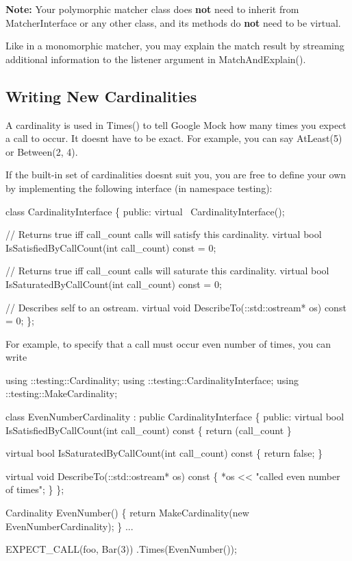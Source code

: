 {\bfseries Note\+:} Your polymorphic matcher class does {\bfseries not} need to inherit from {\ttfamily Matcher\+Interface} or any other class, and its methods do {\bfseries not} need to be virtual.

Like in a monomorphic matcher, you may explain the match result by streaming additional information to the {\ttfamily listener} argument in {\ttfamily Match\+And\+Explain()}.

\subsection*{Writing New Cardinalities}

A cardinality is used in {\ttfamily Times()} to tell Google Mock how many times you expect a call to occur. It doesn\textquotesingle{}t have to be exact. For example, you can say {\ttfamily At\+Least(5)} or {\ttfamily Between(2, 4)}.

If the built-\/in set of cardinalities doesn\textquotesingle{}t suit you, you are free to define your own by implementing the following interface (in namespace {\ttfamily testing})\+:


\begin{DoxyCode}
class CardinalityInterface \{
 public:
  virtual ~CardinalityInterface();

  // Returns true iff call\_count calls will satisfy this cardinality.
  virtual bool IsSatisfiedByCallCount(int call\_count) const = 0;

  // Returns true iff call\_count calls will saturate this cardinality.
  virtual bool IsSaturatedByCallCount(int call\_count) const = 0;

  // Describes self to an ostream.
  virtual void DescribeTo(::std::ostream* os) const = 0;
\};
\end{DoxyCode}


For example, to specify that a call must occur even number of times, you can write


\begin{DoxyCode}
using ::testing::Cardinality;
using ::testing::CardinalityInterface;
using ::testing::MakeCardinality;

class EvenNumberCardinality : public CardinalityInterface \{
 public:
  virtual bool IsSatisfiedByCallCount(int call\_count) const \{
    return (call\_count %
  \}

  virtual bool IsSaturatedByCallCount(int call\_count) const \{
    return false;
  \}

  virtual void DescribeTo(::std::ostream* os) const \{
    *os << "called even number of times";
  \}
\};

Cardinality EvenNumber() \{
  return MakeCardinality(new EvenNumberCardinality);
\}
...

  EXPECT\_CALL(foo, Bar(3))
      .Times(EvenNumber());
\end{DoxyCode}


